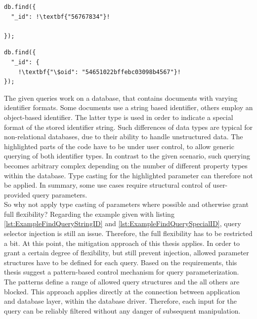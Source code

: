 \begin{minipage}{.97\textwidth}
\begin{minipage}[t]{.49\textwidth}
\begin{lstlisting}[escapechar=!, caption={Example for find query with a string identifier}, label={lst:ExampleFindQueryStringID}]
db.find({
  "_id": !\textbf{"56767834"}!

});
\end{lstlisting}
\end{minipage}
\hfill
\begin{minipage}[t]{.49\textwidth}
\begin{lstlisting}[escapechar=!, caption={Example for find query with a special object identifier}, label={lst:ExampleFindQuerySpecialID}]
db.find({
  "_id": {
    !\textbf{"\$oid": "54651022bffebc03098b4567"}!
});
\end{lstlisting}
\end{minipage}
\end{minipage}

The given queries work on a database, that contains documents with varying identifier formats. Some documents use a string based identifier, others employ an object-based identifier. The latter type is used in order to indicate a special format of the stored identifier string. Such differences of data types are typical for non-relational databases, due to their ability to handle unstructured data. The highlighted parts of the code have to be under user control, to allow generic querying of both identifier types. In contrast to the given scenario, such querying becomes arbitrary complex depending on the number of different property types within the database. Type casting for the highlighted parameter can therefore not be applied. In summary, some use cases require structural control of user-provided query parameters. \\

So why not apply type casting of parameters where possible and otherwise grant full flexibility? Regarding the example given with listing \ref{lst:ExampleFindQueryStringID} and \ref{lst:ExampleFindQuerySpecialID}, query selector injection is still an issue. Therefore, the full flexibility has to be restricted a bit. At this point, the mitigation approach of this thesis applies. In order to grant a certain degree of flexibility, but still prevent injection, allowed parameter structures have to be defined for each query. Based on the requirements, this thesis suggest a pattern-based control mechanism for query parameterization. The patterns define a range of allowed query structures and the all others are blocked. This approach applies directly at the connection between application and database layer, within the database driver. Therefore, each input for the query can be reliably filtered without any danger of subsequent manipulation. \\

